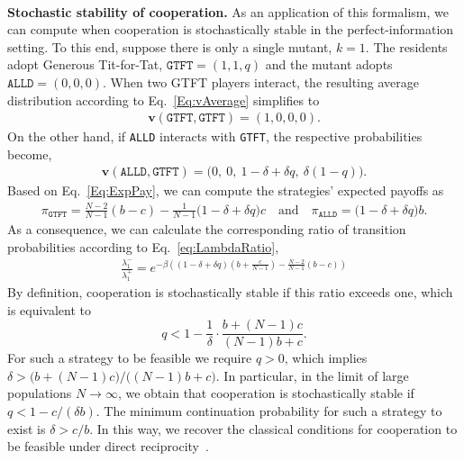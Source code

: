 \documentclass[11pt]{article}
\def\alld{\texttt{ALLD}}
\def\gtft{\texttt{GTFT}}
\theoremstyle{plainCl1}
\theoremstyle{plainCl2}
\begin{document}
~\\
{\bf Stochastic stability of cooperation.}
As an application of this formalism, we can compute when cooperation is stochastically stable in the perfect-information setting. 
To this end, suppose there is only a single mutant, $k\!=\!1$. The residents adopt Generous Tit-for-Tat, $\gtft = (1, 1, q)$ and the mutant adopts $\alld\! = \! (0,0,0)$. When two GTFT players interact, the resulting average distribution according to Eq.~\eqref{Eq:vAverage} simplifies to
\begin{align*}
\mathbf{v}(\gtft,\gtft) = (1, 0, 0, 0).
\end{align*}
On the other hand, if \alld{} interacts with \gtft, the respective probabilities become,
\begin{align*}
  \mathbf{v}(\alld,\gtft) = \big(0,~0,~1\!-\!\delta\!+\!\delta q,~\delta(1\! -\! q)\big).
\end{align*}
Based on Eq.~\eqref{Eq:ExpPay}, we can compute the strategies' expected payoffs as
\begin{align*}
\pi_\gtft =  \frac{N\!-\!2}{N-1} (b - c)  \!-\! \frac{1}{N-1}\big(1\!-\!\delta\!+\!\delta q\big)c
\quad \text{and} \quad
\pi_\alld  = \big(1\!-\!\delta\!+\!\delta q\big)b.
\end{align*}
As a consequence, we can calculate the corresponding ratio of transition probabilities according to Eq.~\eqref{eq:LambdaRatio},
\begin{align*}
\frac{\lambda_1^{-}}{\lambda_1^{+}} = e^{-\beta \left( (1-\delta+\delta q)(b+\frac{c}{N-1})- \frac{N-2}{N-1}(b-c) \right)}
\end{align*}
By definition, cooperation is stochastically stable if this ratio exceeds one, which is equivalent to
\begin{equation}\label{Eq:Condition_PerfectMemory}
q<1-\frac{1}{\delta}\cdot \frac{b+(N\!-\!1)c}{(N\!-\!1)b+c}.
\end{equation}
For such a strategy to be feasible we require $q\!>\!0$, which implies $\delta \!>\! \big(b+(N\!-\!1)c\big)/\big((N\!-\!1)b\!+\!c\big)$.
In particular, in the limit of large populations \(N \!\rightarrow\! \infty\), we obtain that cooperation is stochastically stable if  \(q \!<\! 1\! -\! c/(\delta b)\). 
The minimum continuation probability for such a strategy to exist is $\delta \!>\! c/b$. 
In this way, we recover the classical conditions for cooperation to be feasible under direct reciprocity~\citep{molander:jcr:1985,Nowak1992tit,Schmid:NHB:2021}.
\end{document}
